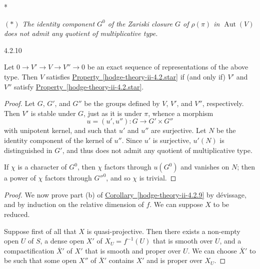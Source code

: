   \begin{property}{*}\setnumber{*}\label{hodge-theory-ii-4.2.star}\skipsinglepar\par{}\emph{\((*)\) The identity component \(G^0\) of the Zariski closure \(G\) of \(\rho (\pi )\) in \(\operatorname {Aut}(V)\) does not admit any quotient of multiplicative type.}\end{property}\begin{lemma}{4.2.10}\label{hodge-theory-ii-4.2.10}\skipsinglepar\par{}Let \(0\to  V'\to  V\to  V''\to 0\) be an exact sequence of representations of the above type.
    Then \(V\) satisfies \hyperref[hodge-theory-ii-4.2.star]{Property~\ref*{hodge-theory-ii-4.2.star}} if (and only if) \(V'\) and \(V''\) satisfy \hyperref[hodge-theory-ii-4.2.star]{Property~\ref*{hodge-theory-ii-4.2.star}}.\begin{proof}\par{}Let \(G\), \(G'\), and \(G''\) be the groups defined by \(V\), \(V'\), and \(V''\), respectively.
      Then \(V'\) is stable under \(G\), just as it is under \(\pi \), whence a morphism
      \[         u         = (u',u'')\colon  G\to  G'\times  G''       \]
      with unipotent kernel, and such that \(u'\) and \(u''\) are surjective.
      Let \(N\) be the identity component of the kernel of \(u''\).
      Since \(u'\) is surjective, \(u'(N)\) is distinguished in \(G'\), and thus does not admit any quotient of multiplicative type.
      
      If \(\chi \) is a character of \(G^0\), then \(\chi \) factors through \(u(G^0)\) and vanishes on \(N\);
      then a power of \(\chi \) factors through \({G''}^0\), and so \(\chi \) is trivial.\end{proof}\end{lemma}\begin{proof}\par{}We now prove part (b) of \hyperref[hodge-theory-ii-4.2.9]{Corollary~\ref*{hodge-theory-ii-4.2.9}} by dévissage, and by induction on the relative dimension of \(f\).
    We can suppose \(X\) to be reduced.\par{}Suppose first of all that \(X\) is quasi-projective.
    Then there exists a non-empty open \(U\) of \(S\), a dense open \(X'\) of \(X_U=f^{-1}(U)\) that is smooth over \(U\), and a compactification \(\overline {X}'\) of \(X'\) that is smooth and proper over \(U\).
    We can choose \(\overline {X}'\) to be such that some open \(X''\) of \(\overline {X}'\) contains \(X'\) and is proper over \(X_U\).


\end{proof}
